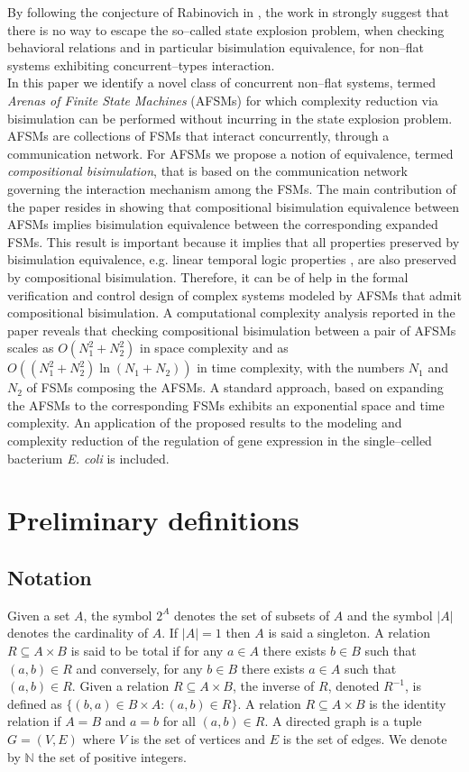 \documentclass{amsart}
\theoremstyle{definition}
\theoremstyle{remark}
\numberwithin{equation}{section}
\begin{document}
By following the conjecture of Rabinovich in \cite{StateExplosion0}, the work in \cite{StateExplosion2,StateExplosion1} strongly suggest that there is no way to escape the so--called state explosion problem, when checking behavioral relations and in particular bisimulation equivalence, for non--flat systems exhibiting concurrent--types interaction. \\
In this paper we identify a novel class of concurrent non--flat systems, termed \textit{Arenas of Finite State Machines} (AFSMs) for which complexity reduction via bisimulation can be performed without incurring in the state explosion problem. AFSMs are collections of FSMs that interact concurrently, through a communication network. For AFSMs we propose a notion of equivalence, termed \textit{compositional bisimulation}, that is based on the communication network governing the interaction mechanism among the FSMs. The main contribution of the paper resides in showing that compositional bisimulation equivalence between AFSMs implies bisimulation equivalence between the corresponding expanded FSMs. 
This result is important because it implies that all properties preserved by bisimulation equivalence, e.g. linear temporal logic properties \cite{ModelChecking}, are also preserved by compositional bisimulation. Therefore, it can be of help in the formal verification and control design of complex systems modeled by AFSMs that admit compositional bisimulation. 
A computational complexity analysis reported in the paper reveals that 
checking compositional bisimulation between a pair of AFSMs scales as $O(N_{1}^{2}+N_{2}^{2})$ in space complexity and as $O((N_{1}^{2}+N_{2}^{2})\ln(N_{1}+N_{2}))$ in time complexity, with the numbers $N_{1}$ and $N_{2}$ of FSMs composing the AFSMs.  
A standard approach, based on expanding the AFSMs to the corresponding FSMs exhibits an exponential space and time complexity. 
An application of the proposed results to the modeling and complexity reduction of the regulation of gene expression in the single--celled bacterium \textit{E. coli} is included.

\section{Preliminary definitions}
\label{Sec:FSM}
\subsection{Notation}
Given a set $A$, the symbol $2^{A}$ denotes the set of subsets of $A$ and the symbol $|A|$ denotes the cardinality of $A$. 
If $|A|=1$ then $A$ is said a singleton. 
A relation $R\subseteq A\times B$ is said to be total if for any $a\in A$ there exists $b\in B$ such that $(a,b)\in R$ and conversely, for any $b\in B$ there exists $a\in A$ such that $(a,b)\in R$. Given a relation $R\subseteq A\times B$, the inverse of $R$, denoted $R^{-1}$, is defined as $\{(b,a)\in B\times A : (a,b)\in R\}$. A relation $R\subseteq A\times B$ is the identity relation if $A=B$ and $a=b$ for all $(a,b)\in R$. A directed graph is a tuple $G=(V,E)$ where $V$ is the set of vertices and $E$ is the set of edges. We denote by $\mathbb{N}$ the set of positive integers. 
\end{document}
